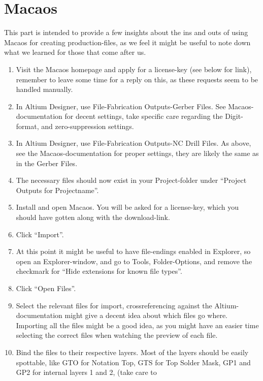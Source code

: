 \section{Macaos}\label{app:macaos}

This part is intended to provide a few insights about the ins and outs of using
Macaos for creating production-files, as we feel it might be useful to note down
what we learned for those that come after us.

\begin{enumerate}
\item Visit the Macaos homepage and apply for a license-key (see below for
  link), remember to leave some time for a reply on this, as these requests seem
  to be handled manually.
\item In Altium Designer, use File-Fabrication Outputs-Gerber Files. See
  Macaos-documentation for decent settings, take specific care regarding the
  Digit-format, and zero-suppression settings.
\item In Altium Designer, use File-Fabrication Outputs-NC Drill Files. As above,
  see the Macaos-documentation for proper settings, they are likely the same as
  in the Gerber Files.
\item The necessary files should now exist in your Project-folder under
  ``Project Outputs for Projectname''.
\item Install and open Macaos. You will be asked for a license-key, which you
  should have gotten along with the download-link.
\item Click ``Import''.
\item At this point it might be useful to have file-endings enabled in
  Explorer, so open an Explorer-window, and go to Tools, Folder-Options, and
  remove the checkmark for ``Hide extensions for known file types''.
\item Click ``Open Files''.
\item Select the relevant files for import, crossreferencing against the
  Altium-documentation might give a decent idea about which files go where.
  Importing all the files might be a good idea, as you might have an easier time
  selecting the correct files when watching the preview of each file.
\item Bind the files to their respective layers. Most of the layers should be
  easily spottable, like GTO for Notation Top, GTS for Top Solder Mask, GP1 and
  GP2 for internal layers 1 and 2,  (take care to

\end{enumerate}
